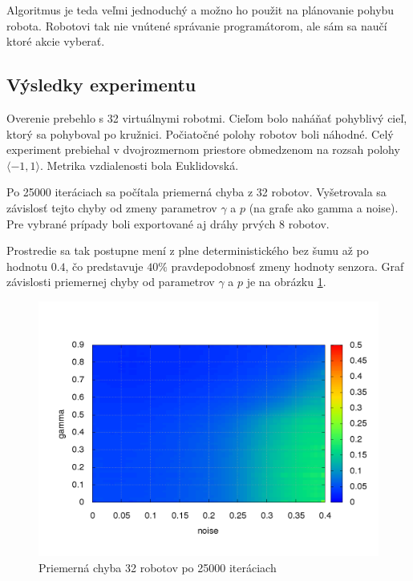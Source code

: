 Algoritmus je teda veľmi jednoduchý a možno ho použit na plánovanie pohybu robota.
Robotovi tak nie vnútené správanie programátorom, ale sám sa naučí ktoré akcie
vyberať.


\subsection{Výsledky experimentu}

Overenie prebehlo s 32 virtuálnymi robotmi. Cieľom bolo naháňať pohyblivý cieľ,
ktorý sa pohyboval po kružnici. Počiatočné polohy robotov boli náhodné.
Celý experiment prebiehal v dvojrozmernom priestore obmedzenom na rozsah
polohy $\langle -1, 1 \rangle$. Metrika vzdialenosti bola Euklidovská.

Po 25000 iteráciach sa počítala priemerná chyba z 32 robotov. Vyšetrovala
sa závislosť tejto chyby od zmeny parametrov $\gamma$ a $p$ (na grafe ako gamma a noise).
Pre vybrané prípady boli exportované aj dráhy prvých 8 robotov.

Prostredie sa tak postupne mení z plne deterministického bez šumu až po hodnotu $0.4$,
čo predstavuje $40\%$ pravdepodobnosť zmeny hodnoty senzora. Graf závislosti priemernej chyby
od parametrov $\gamma$ a $p$ je na obrázku \ref{img:nano_q_summary}.

\begin{figure}[!htb]
\centering
\includegraphics[scale=.4]{../../results_q_learning/nano_q_learning/summary_result_average_error_map.png}
\caption{Priemerná chyba 32 robotov po 25000 iteráciach}
\label{img:nano_q_summary}
\end{figure}


